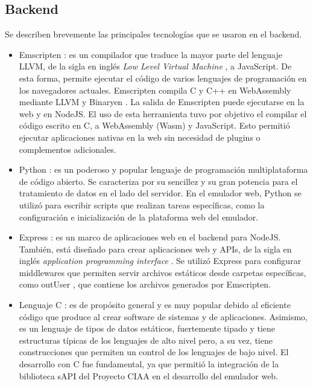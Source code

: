 \subsection{Backend}

Se describen brevemente las principales tecnologías que se usaron en el backend.

\begin{itemize}
	\item Emscripten \citep{Emscripten}: es un compilador que traduce la mayor parte del lenguaje LLVM, de la sigla en inglés \textit{Low Level Virtual Machine} \citep{LLVM}, a JavaScript. De esta forma, permite ejecutar el código de varios lenguajes de programación en los navegadores actuales.
Emscripten compila C y C++ en WebAssembly \citep{WebAssembly} mediante LLVM y Binaryen \citep{Binaryen}. La salida de Emscripten puede ejecutarse en la web y en NodeJS.
El uso de esta herramienta tuvo por objetivo el compilar el código escrito en C, a WebAssembly (Wasm) y JavaScript.	Esto permitió ejecutar aplicaciones nativas en la web sin necesidad de plugins o complementos adicionales.

	\item Python \citep{Python}:  es un poderoso y popular lenguaje de programación multiplataforma de código abierto. Se caracteriza por su sencillez y su gran potencia para el tratamiento de datos en el lado del servidor. En el emulador web, Python se utilizó para escribir scripts que realizan tareas específicas, como la configuración e inicialización de la plataforma web del emulador.
    
    \item Express \citep{Express}: es un marco de aplicaciones web en el backend para NodeJS. También, está diseñado para crear aplicaciones web y APIs, de la sigla en inglés \textit{application programming interface} \citep{API}. Se utilizó Express para configurar middlewares que permiten servir archivos estáticos desde carpetas específicas, como \textquotedbl outUser \textquotedbl, que contiene los archivos generados por Emscripten.
    
    \item Lenguaje C \citep{LenguajeC}: es de propósito general y es muy popular debido al eficiente código que produce al crear software de sistemas y de aplicaciones. 
    Asimismo, es un lenguaje de tipos de datos estáticos, fuertemente tipado y tiene estructuras típicas de los lenguajes de alto nivel pero, a su vez, tiene construcciones que permiten un control de los lenguajes de bajo nivel. El desarrollo con C fue fundamental, ya que permitió la integración de la biblioteca sAPI del Proyecto  CIAA en el desarrollo del emulador web.
    

\end{itemize}
